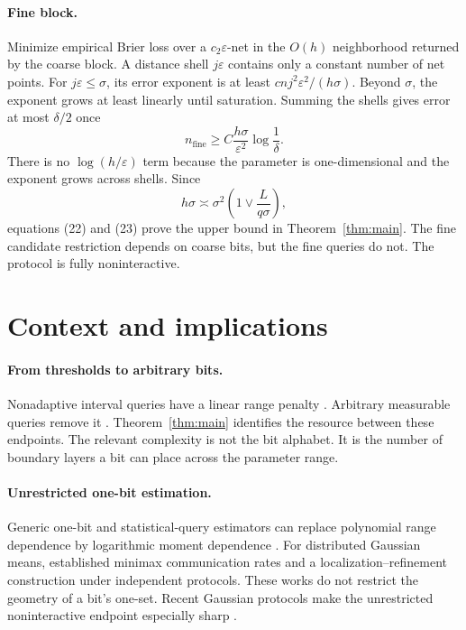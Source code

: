 \documentclass{article}
\theoremstyle{definition}
\theoremstyle{remark}
\newcommand{\1}{\mathbf 1}
\begin{document}
\paragraph{Fine block.} Minimize empirical Brier loss over a \(c_2\varepsilon\)-net in the \(O(h)\) neighborhood returned by the coarse block. A distance shell \(j\varepsilon\) contains only a constant number of net points. For \(j\varepsilon\leq\sigma\), its error exponent is at least \(cnj^2\varepsilon^2/(h\sigma)\). Beyond \(\sigma\), the exponent grows at least linearly until saturation. Summing the shells gives error at most \(\delta/2\) once
\[ n_{\mathrm{fine}}\geq C\frac{h\sigma}{\varepsilon^2}\log\frac1\delta. \tag{23} \] There is no \(\log(h/\varepsilon)\) term because the parameter is one-dimensional and the exponent grows across shells. Since \[ h\sigma\asymp \sigma^2\left(1\vee\frac{L}{q\sigma}\right), \] equations (22) and (23) prove the upper bound in Theorem~\ref{thm:main}. The fine candidate restriction depends on coarse bits, but the fine queries do not. The protocol is fully noninteractive.

\section{Context and implications}

\paragraph{From thresholds to arbitrary bits.} Nonadaptive interval queries have a linear range penalty \citep{lau2026order}. Arbitrary measurable queries remove it \citep{miao2026universal,hu2026interaction}. Theorem~\ref{thm:main} identifies the resource between these endpoints. The relevant complexity is not the bit alphabet. It is the number of boundary layers a bit can place across the parameter range.

\paragraph{Unrestricted one-bit estimation.} Generic one-bit and statistical-query estimators can replace polynomial range dependence by logarithmic moment dependence \citep{feldman2017range}. For distributed Gaussian means, \citet{cai2024distributed} established minimax communication rates and a localization--refinement construction under independent protocols. These works do not restrict the geometry of a bit's one-set. Recent Gaussian protocols make the unrestricted noninteractive endpoint especially sharp \citep{miao2026universal,hu2026interaction}.
\end{document}
